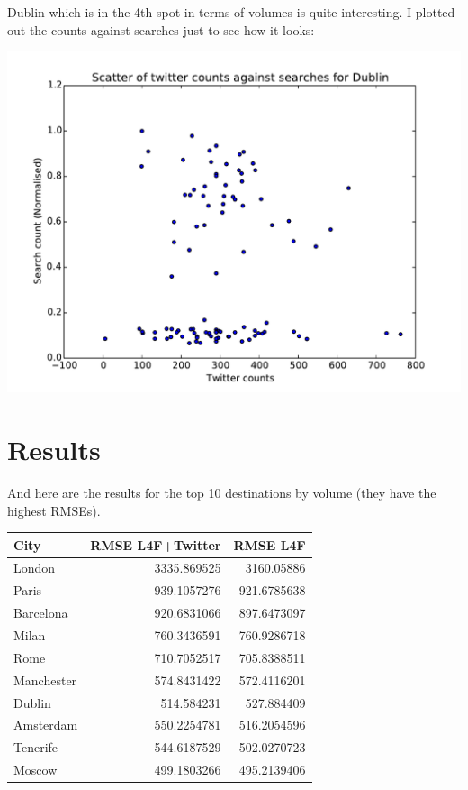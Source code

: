 \documentclass[minf,frontabs,twoside,singlespacing,parskip]{infthesis}
\begin{document}
Dublin which is in the 4th spot in terms of volumes is quite interesting. I plotted out the counts against searches just to see how it looks:

\includegraphics[width=\textwidth]{Dublin}  

\newpage
\section{Results}

And here are the results for the top 10 destinations by volume (they have the highest RMSEs).

\begin{tabular}{ l | r | r }
City	& RMSE L4F+Twitter &RMSE L4F \\
\hline
London & 3335.869525 & 3160.05886 \\
Paris	 & 939.1057276 & 921.6785638  \\
Barcelona & 920.6831066 & 897.6473097  \\
Milan & 760.3436591 & 760.9286718  \\
Rome & 710.7052517 & 705.8388511  \\
Manchester & 574.8431422 & 572.4116201  \\
Dublin & 514.584231	 & 527.884409  \\
Amsterdam & 550.2254781 & 516.2054596  \\
Tenerife & 544.6187529 & 502.0270723  \\
Moscow & 499.1803266 & 495.2139406  \\
\end{tabular}
\end{document}
